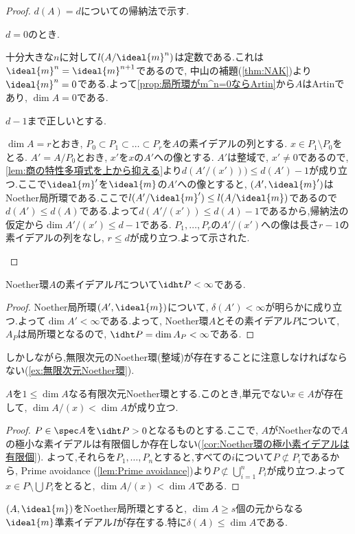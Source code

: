 \begin{proof}
	$d(A)=d$についての帰納法で示す.
	\begin{step}
		\item $d=0$のとき.
		
		十分大きな$n$に対して$l(A/\ideal{m}^n)$は定数である.これは$\ideal{m}^n=\ideal{m}^{n+1}$であるので, 中山の補題(\ref{thm:NAK})より$\ideal{m}^n=0$である.よって\ref{prop:局所環がm^n=0ならArtin}から$A$はArtinであり, $\dim A=0$である.
		
		\item $d-1$まで正しいとする.
		
		$\dim A=r$とおき, $P_0\subset P_1\subset\dots\subset P_r$を$A$の素イデアルの列とする. $x\in P_1\setminus P_0$をとる. $A'=A/P_0$とおき, $x'$を$x$の$A'$への像とする. $A'$は整域で, $x'\neq0$であるので, \ref{lem:商の特性多項式を上から抑える}より$d(A'/(x')))\leq d(A')-1$が成り立つ.ここで$\ideal{m}'$を$\ideal{m}$の$A'$への像とすると, $(A',\ideal{m}')$はNoether局所環である.ここで$l(A'/\ideal{m}')\leq l(A/\ideal{m})$であるので$d(A')\leq d(A)$である.よって$d(A'/(x'))\leq d(A)-1$であるから,帰納法の仮定から$\dim A'/(x')\leq d-1$である. $P_1,\dots,P_r$の$A'/(x')$への像は長さ$r-1$の素イデアルの列をなし, $r\leq d$が成り立つ.よって示された.
	\end{step}
\end{proof}

\begin{cor}
	Noether環$A$の素イデアル$P$について$\idht P<\infty$である.
\end{cor}

\begin{proof}
	Noether局所環$(A',\ideal{m})$について, $\delta(A')<\infty$が明らかに成り立つ.よって$\dim A'<\infty$である.よって, Noether環$A$とその素イデアル$P$について, $A_P$は局所環となるので, $\idht P=\dim A_P<\infty$である.
\end{proof}

しかしながら,無限次元のNoether環(整域)が存在することに注意しなければならない(\ref{ex:無限次元Noether環}).

\begin{lem}
	$A$を$1\leq\dim A$なる有限次元Noether環とする.このとき,単元でない$x\in A$が存在して, $\dim A/(x)<\dim A$が成り立つ.
\end{lem}

\begin{proof}
	$P\in\spec A$を$\idht P>0$となるものとする.ここで, $A$がNoetherなので$A$の極小な素イデアルは有限個しか存在しない(\ref{cor:Noether環の極小素イデアルは有限個}). よって,それらを$P_1,\dots, P_n$とすると,すべての$i$について$P\not\subset P_i$であるから, Prime avoidance (\ref{lem:Prime avoidance})より$P\not\subset\bigcup_{i=1}^nP_i$が成り立つ.よって$x\in P\setminus\bigcup P_i$をとると, $\dim A/(x)<\dim A$である.

\end{proof}
\begin{prop}\label{prop:dim A geq delta(A)}
	$(A,\ideal{m})$をNoether局所環とすると, $\dim A\geq s$個の元からなる$\ideal{m}$準素イデアル$I$が存在する.特に$\delta(A)\leq\dim A$である.
\end{prop}

